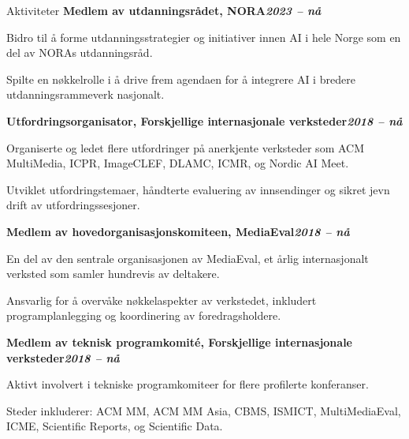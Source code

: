 \begin{rubric}{Aktiviteter}
\entry*[]%
\textbf{Medlem av utdanningsrådet, NORA\hfill\textit{2023 -- nå}} \par
\begin{compactitem}
    \item Bidro til å forme utdanningsstrategier og initiativer innen AI i hele Norge som en del av NORAs utdanningsråd.
    \item Spilte en nøkkelrolle i å drive frem agendaen for å integrere AI i bredere utdanningsrammeverk nasjonalt.
    \vspace{-12pt}
\end{compactitem}
% 
\entry*[]%
\textbf{Utfordringsorganisator, Forskjellige internasjonale verksteder\hfill\textit{2018 -- nå}} \par
\begin{compactitem}
    \item Organiserte og ledet flere utfordringer på anerkjente verksteder som ACM MultiMedia, ICPR, ImageCLEF, DLAMC, ICMR, og Nordic AI Meet.
    \item Utviklet utfordringstemaer, håndterte evaluering av innsendinger og sikret jevn drift av utfordringssesjoner.
    \vspace{-12pt}
\end{compactitem}
%
\entry*[]%
\textbf{Medlem av hovedorganisasjonskomiteen, MediaEval\hfill\textit{2018 -- nå}} \par
\begin{compactitem}
    \item En del av den sentrale organisasjonen av MediaEval, et årlig internasjonalt verksted som samler hundrevis av deltakere.
    \item Ansvarlig for å overvåke nøkkelaspekter av verkstedet, inkludert programplanlegging og koordinering av foredragsholdere.
    \vspace{-12pt}
\end{compactitem}
% 
\entry*[]%
\textbf{Medlem av teknisk programkomité, Forskjellige internasjonale verksteder\hfill\textit{2018 -- nå}} \par
\begin{compactitem}
    \item Aktivt involvert i tekniske programkomiteer for flere profilerte konferanser.
    \item Steder inkluderer: ACM MM, ACM MM Asia, CBMS, ISMICT, MultiMediaEval, ICME, Scientific Reports, og Scientific Data.
    \vspace{-12pt}
\end{compactitem}

\end{rubric}

